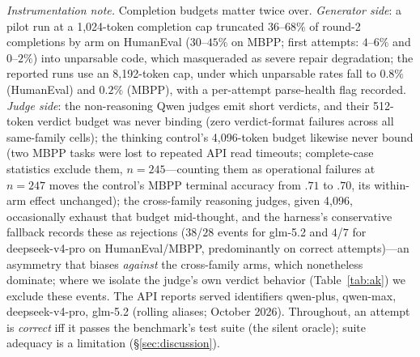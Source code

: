 \documentclass[10pt]{article}
\begin{document}
\emph{Instrumentation note.}  Completion budgets matter twice
over.  \emph{Generator side}: a pilot run at a 1{,}024-token
completion cap truncated $36$--$68\%$ of round-2 completions by
arm on HumanEval ($30$--$45\%$ on MBPP; first attempts: $4$--$6\%$
and $0$--$2\%$) into unparsable code, which masqueraded as severe
repair degradation; the reported runs use an 8{,}192-token cap,
under which unparsable rates fall to $0.8\%$ (HumanEval) and
$0.2\%$ (MBPP), with a per-attempt parse-health flag recorded.
\emph{Judge side}: the non-reasoning Qwen judges emit short
verdicts, and their 512-token verdict budget was never binding
(zero verdict-format failures across all same-family cells); the
thinking control's 4{,}096-token budget likewise never bound (two
MBPP tasks were lost to repeated API read timeouts; complete-case
statistics exclude them, $n{=}245$---counting them as operational
failures at $n{=}247$ moves the control's MBPP terminal accuracy
from $.71$ to $.70$, its within-arm effect unchanged); the
cross-family reasoning judges,
given 4{,}096, occasionally exhaust that budget mid-thought, and
the harness's conservative fallback records these as rejections
($38$/$28$ events for glm-5.2 and $4$/$7$ for deepseek-v4-pro on
HumanEval/MBPP, predominantly on correct attempts)---an asymmetry
that biases \emph{against} the cross-family arms, which
nonetheless dominate; where we isolate the judge's own verdict
behavior (Table~\ref{tab:ak}) we exclude these events.  The API
reports served identifiers qwen-plus, qwen-max, deepseek-v4-pro,
glm-5.2 (rolling aliases; October 2026).  Throughout, an attempt
is \emph{correct} iff it passes the benchmark's test suite (the
silent oracle); suite adequacy is a limitation
(§\ref{sec:discussion}).
\end{document}
